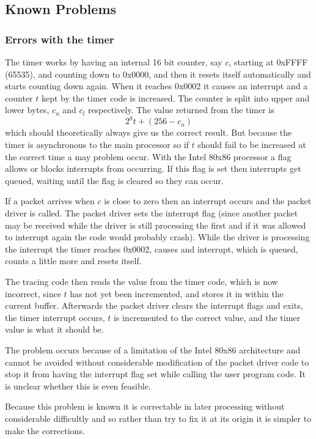 \subsection{Known Problems}

\subsubsection{Errors with the timer}
\label{trace:timerprob}

The timer works by having an internal 16 bit counter, say $c$,
starting at 0xFFFF (65535), and counting down to 0x0000, and then it
resets itself automatically and starts counting down again.  When it
reaches 0x0002 it causes an interrupt and a counter $t$ kept by the
timer code is increased.  The counter is split into upper and lower
bytes, $c_u$ and $c_l$ respectively.  The value returned from the
timer is
\[
2^{8}t + (256 - c_u)
\]
which should theoretically always give us the correct result.  But
because the timer is asynchronous to the main processor so if $t$
should fail to be increased at the correct time a may problem occur.
With the Intel 80x86 processor a flag allows or blocks interrupts from
occurring.  If this flag is set then interrupts get queued, waiting
until the flag is cleared so they can occur.

If a packet arrives when $c$ is close to zero then an interrupt occurs
and the packet driver is called.  The packet driver sets the interrupt
flag (since another packet may be received while the driver is still
processing the first and if it was allowed to interrupt again the code
would probably crash).  While the driver is processing the interrupt
the timer reaches 0x0002, causes and interrupt, which is queued,
counts a little more and resets itself.

The tracing code then reads the value from the timer code, which is
now incorrect, since $t$ has not yet been incremented, and stores it
in within the current buffer.  Afterwards the packet driver clears the
interrupt flags and exits, the timer interrupt occurs, $t$ is
incremented to the correct value, and the timer value is what it
should be.

The problem occurs because of a limitation of the Intel 80x86
architecture and cannot be avoided without considerable modification
of the packet driver code to stop it from having the interrupt flag
set while calling the user program code.  It is unclear whether this
is even feasible.

Because this problem is known it is correctable in later processing
without considerable difficultly and so rather than try to fix it at
its origin it is simpler to make the corrections.

